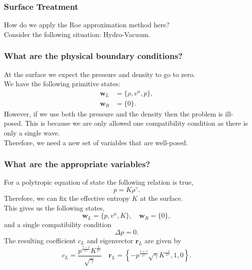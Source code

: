 \documentclass{beamer}
\begin{document}
\begin{frame}
\frametitle{Surface Treatment}
How do we apply the Roe approximation method here?\\
Consider the following situation: Hydro-Vacuum.\\
\centering
\raggedright
\end{frame}

\begin{frame}
\frametitle{What are the physical boundary conditions?}
At the surface we expect the pressure and density to go to zero. \\
We have the following primitive states:
\begin{align}
\mathbf{w}_L &= \{\rho, v^n, p\},\\
\mathbf{w}_R&=\{0\}.
\end{align}
However, if we use both the pressure and the density then the problem is ill-posed. This is because we are only allowed one compatibility condition as there is only a single wave. \\
Therefore, we need a new set of variables that are well-posed.
\end{frame}

\begin{frame}
\frametitle{What are the appropriate variables?}
For a polytropic equation of state the following relation is true, 
\begin{equation}
p = K \rho^{\gamma}.
\end{equation}
Therefore, we can fix the effective entropy $K$ at the surface. \\
This gives us the following states,
\begin{equation}
\mathbf{w}_L = \{p,v^n,K\}, \quad \mathbf{w}_R = \{0\},
\end{equation}
and a single compatibility condition
\begin{equation}
\Delta p = 0.
\end{equation}
The resulting coefficient $c_L$ and eigenvector $\mathbf{r}_L$ are given by
\begin{equation}
c_L = \dfrac{p^{\frac{\gamma - 1}{2\gamma}}K^{\frac{1}{2\gamma}}}{\sqrt{\gamma}} \quad \mathbf{r}_L = \left\{-p^{\frac{1+\gamma}{2\gamma}}\sqrt{\gamma}K^{\frac{-1}{2\gamma}},1,0\right\}.
\end{equation}
\end{frame}
\end{document}
